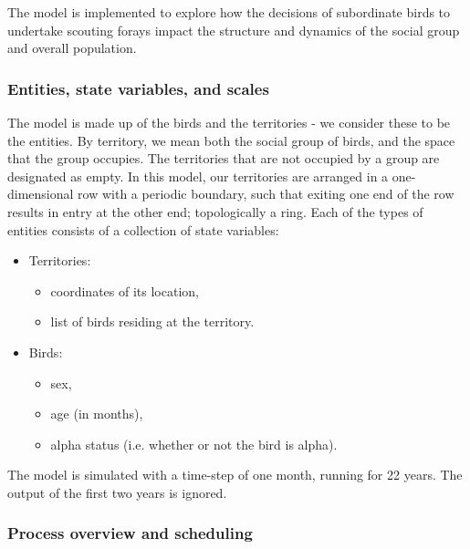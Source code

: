 The model is implemented to explore how the decisions of subordinate birds to undertake scouting forays impact the structure and dynamics of the social group and overall population.

\subsubsection{Entities, state variables, and scales}
\label{thiele:intro:example:entities}

The model is made up of the birds and the territories - we consider these to be the entities.
By territory, we mean both the social group of birds, and the space that the group occupies.
The territories that are not occupied by a group are designated as empty.
In this model, our territories are arranged in a one-dimensional row with a periodic boundary, such that exiting one end of the row results in entry at the other end; topologically a ring.
Each of the types of entities consists of a collection of state variables:
\begin{itemize}
    \item Territories:
    \begin{itemize}
        \item coordinates of its location,
        \item list of birds residing at the territory.
    \end{itemize}
    \item Birds:
    \begin{itemize}
        \item sex,
        \item age (in months),
        \item alpha status (i.e. whether or not the bird is alpha).
    \end{itemize}
\end{itemize}
The model is simulated with a time-step of one month, running for 22 years.
The output of the first two years is ignored.

\subsubsection{Process overview and scheduling}
\label{thiele:intro:example:overview}

